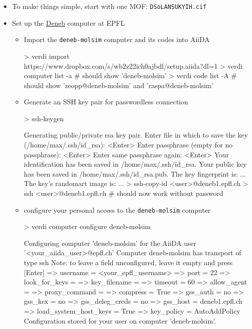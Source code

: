 \documentclass[twoside,a4paper,11pt]{extarticle}
\begin{document}
\begin{itemize}
    \item To make things simple, start with one MOF: \verb|DSoLANSUKYIH.cif|
    \item Set up the  \href{https://scitas.epfl.ch/hardware/deneb-and-eltanin}{Deneb} computer at EPFL
    \begin{itemize}
        \item Import the \verb|deneb-molsim| computer and its codes into AiiDA
        
\begin{bashcommand}
> verdi import https://www.dropbox.com/s/wb2z22ich0ajbdl/setup.aiida?dl=1
> verdi computer list -a  # should show 'deneb-molsim'
> verdi code list -A   # should show 'zeopp@deneb-molsim' and 'raspa@deneb-molsim'
\end{bashcommand}
    
        \item Generate an SSH key pair for passwordless connection
\begin{bashcommand}
> ssh-keygen

Generating public/private rsa key pair.
Enter file in which to save the key (/home/max/.ssh/id_rsa): <Enter>
Enter passphrase (empty for no passphrase): <Enter>
Enter same passphrase again: <Enter>
Your identification has been saved in /home/max/.ssh/id_rsa.
Your public key has been saved in /home/max/.ssh/id_rsa.pub.
The key fingerprint is:
...
The key's randomart image is:
...
> ssh-copy-id <user>@deneb1.epfl.ch
> ssh <user>@deneb1.epfl.ch   # should now work without password
\end{bashcommand}
        \item configure your personal access to the \verb|deneb-molsim| computer
\begin{bashcommand}
> verdi computer configure deneb-molsim

Configuring computer 'deneb-molsim' for the AiiDA user '<your_aiida_user>@epfl.ch'
Computer deneb-molsim has transport of type ssh
Note: to leave a field unconfigured, leave it empty and press [Enter]
=> username = <your_epfl_username>
=> port = 22
=> look_for_keys = 
=> key_filename = 
=> timeout = 60
=> allow_agent = 
=> proxy_command = 
=> compress = True
=> gss_auth = no
=> gss_kex = no
=> gss_deleg_creds = no
=> gss_host = deneb1.epfl.ch
=> load_system_host_keys = True
=> key_policy = AutoAddPolicy
Configuration stored for your user on computer 'deneb-molsim'.
\end{bashcommand}


\end{itemize}
\end{itemize}
\end{document}
